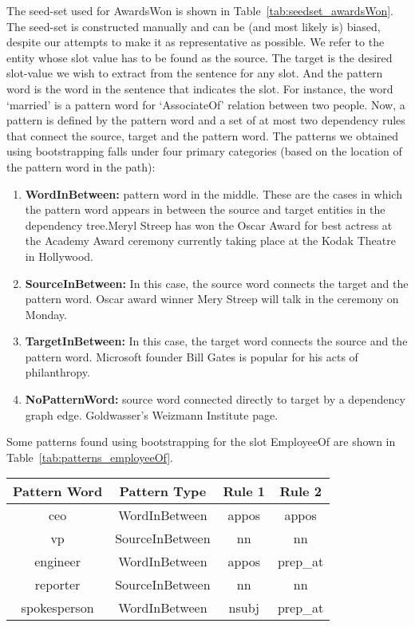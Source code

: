 \begin{itemize}[label={}]
The seed-set used for AwardsWon is shown in Table~\ref{tab:seedset_awardsWon}. The seed-set is constructed manually and can be (and most likely is) biased, despite our attempts to make it as representative as possible. We refer to the entity whose slot value has to be found as the source. The target is the desired slot-value we wish to extract from the sentence for any slot. And the pattern word is the word in the sentence that indicates the slot. For instance, the word ‘married’ is a pattern word for ‘AssociateOf’ relation between two people. Now, a pattern is defined by the pattern word and a set of at most two dependency rules that connect the source, target and the pattern word. The patterns we obtained using bootstrapping falls under four primary categories (based on the location of the pattern word in the path): 
\begin{enumerate}
\item \textbf{WordInBetween:} pattern word in the middle. These are the cases in which the pattern word appears in between the source and target entities in the dependency tree.Meryl Streep has won the Oscar Award for best actress at the Academy Award ceremony currently taking place at the Kodak Theatre in Hollywood.
\item \textbf{SourceInBetween:} In this case, the source word connects the target and the pattern word. Oscar award winner Mery Streep will talk in the ceremony on Monday.
\item \textbf{TargetInBetween:} In this case, the target word connects the source and the pattern word. Microsoft founder Bill Gates is popular for his acts of philanthropy.
\item \textbf{NoPatternWord:} source word connected directly to target by a dependency graph edge. Goldwasser's Weizmann Institute page.
\end{enumerate}
Some patterns found using bootstrapping for the slot EmployeeOf are shown in Table~\ref{tab:patterns_employeeOf}. 

\begin{table*}[ht]
\centering
\begin{tabular}{|c|c|c|c|}
\hline
Pattern Word & Pattern Type & Rule 1 & Rule 2 \\
\hline
ceo & WordInBetween & appos & appos \\
vp & SourceInBetween & nn & nn \\
engineer & WordInBetween & appos & prep\_at \\
reporter & SourceInBetween & nn & nn \\
spokesperson & WordInBetween & nsubj & prep\_at \\
\hline
\end{tabular}
\caption{Some patterns obtained using bootstrap for the slot EmployeeOf}
\label{tab:patterns_employeeOf}
\end{table*}


\end{itemize}
